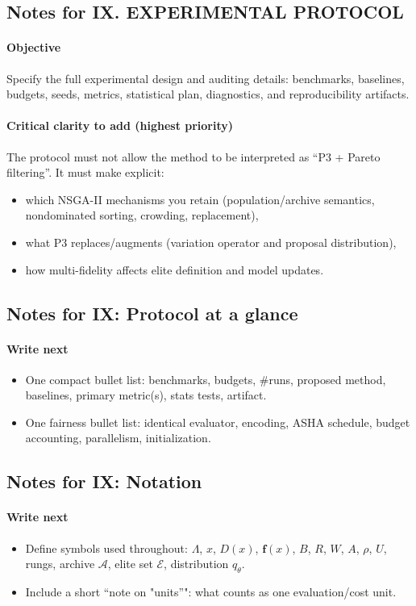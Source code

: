 \subsection*{Notes for IX. EXPERIMENTAL PROTOCOL}
\paragraph{Objective}
Specify the full experimental design and auditing details: benchmarks, baselines, budgets, seeds, metrics, statistical plan, diagnostics, and reproducibility artifacts.

\paragraph{Critical clarity to add (highest priority)}
The protocol must not allow the method to be interpreted as “P3 + Pareto filtering”. It must make explicit:
\begin{itemize}
  \item which NSGA-II mechanisms you retain (population/archive semantics, nondominated sorting, crowding, replacement),
  \item what P3 replaces/augments (variation operator and proposal distribution),
  \item how multi-fidelity affects elite definition and model updates.
\end{itemize}

\subsection*{Notes for IX: Protocol at a glance}
\paragraph{Write next}
\begin{itemize}
  \item One compact bullet list: benchmarks, budgets, \#runs, proposed method, baselines, primary metric(s), stats tests, artifact.
  \item One fairness bullet list: identical evaluator, encoding, ASHA schedule, budget accounting, parallelism, initialization.
\end{itemize}

\subsection*{Notes for IX: Notation}
\paragraph{Write next}
\begin{itemize}
  \item Define symbols used throughout: $\Lambda$, $x$, $D(x)$, $\mathbf{f}(x)$, $B$, $R$, $W$, $A$, $\rho$, $U$, rungs, archive $\mathcal{A}$, elite set $\mathcal{E}$, distribution $q_\theta$.
  \item Include a short “note on "units”": what counts as one evaluation/cost unit.
\end{itemize}

